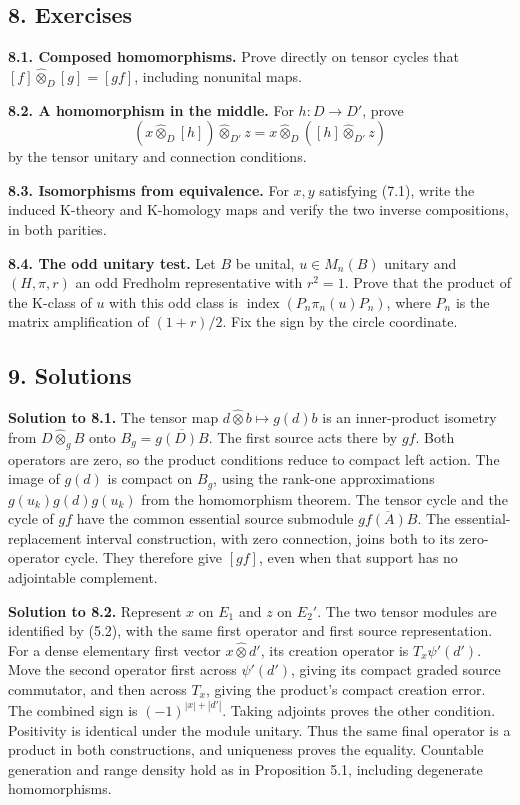 \documentclass[
  11pt,
]{article}
\begin{document}
\subsection{8. Exercises}\label{exercises}

\textbf{8.1. Composed homomorphisms.} Prove directly on tensor cycles
that \([f]\widehat\otimes_D[g]=[g f]\), including nonunital maps.

\textbf{8.2. A homomorphism in the middle.} For \(h:D\to D'\), prove \[
(x\widehat\otimes_D[h])\widehat\otimes_{D'}z
=x\widehat\otimes_D([h]\widehat\otimes_{D'}z)
\] by the tensor unitary and connection conditions.

\textbf{8.3. Isomorphisms from equivalence.} For \(x,y\) satisfying
(7.1), write the induced K-theory and K-homology maps and verify the two
inverse compositions, in both parities.

\textbf{8.4. The odd unitary test.} Let \(B\) be unital, \(u\in M_n(B)\)
unitary and \((H,\pi,r)\) an odd Fredholm representative with \(r^2=1\).
Prove that the product of the K-class of \(u\) with this odd class is
\(\operatorname{index}(P_n\pi_n(u)P_n)\), where \(P_n\) is the matrix
amplification of \((1+r)/2\). Fix the sign by the circle coordinate.

\subsection{9. Solutions}\label{solutions}

\textbf{Solution to 8.1.} The tensor map
\(d\widehat\otimes b\mapsto g(d)b\) is an inner-product isometry from
\(D\widehat\otimes_g B\) onto \(B_g=\overline{g(D)B}\). The first source
acts there by \(g f\). Both operators are zero, so the product
conditions reduce to compact left action. The image of \(g(d)\) is
compact on \(B_g\), using the rank-one approximations
\(g(u_k)g(d)g(u_k)\) from the homomorphism theorem. The tensor cycle and
the cycle of \(g f\) have the common essential source submodule
\(\overline{g f(A)B}\). The essential-replacement interval construction,
with zero connection, joins both to its zero-operator cycle. They
therefore give \([g f]\), even when that support has no adjointable
complement.

\textbf{Solution to 8.2.} Represent \(x\) on \(E_1\) and \(z\) on
\(E_2'\). The two tensor modules are identified by (5.2), with the same
first operator and first source representation. For a dense elementary
first vector \(x\widehat\otimes d'\), its creation operator is
\(T_x\psi'(d')\). Move the second operator first across \(\psi'(d')\),
giving its compact graded source commutator, and then across \(T_x\),
giving the product's compact creation error. The combined sign is
\((-1)^{|x|+|d'|}\). Taking adjoints proves the other condition.
Positivity is identical under the module unitary. Thus the same final
operator is a product in both constructions, and uniqueness proves the
equality. Countable generation and range density hold as in Proposition
5.1, including degenerate homomorphisms.
\end{document}
